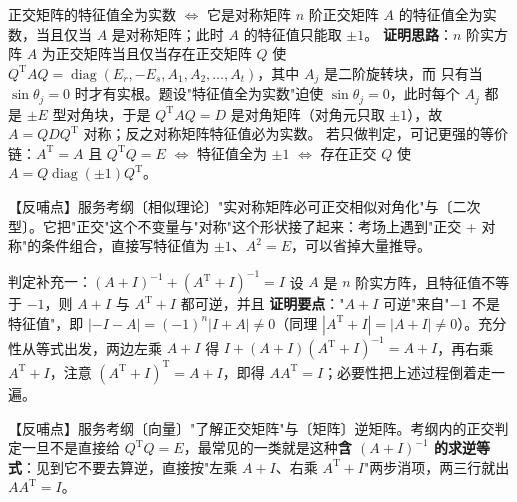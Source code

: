 \begin{fdeep}{正交矩阵的特征值全为实数 $\iff$ 它是对称矩阵}
$n$ 阶正交矩阵 $A$ 的特征值全为实数，当且仅当 $A$ 是对称矩阵；此时 $A$ 的特征值只能取 $\pm1$。
\textbf{证明思路}：$n$ 阶实方阵 $A$ 为正交矩阵当且仅当存在正交矩阵 $Q$ 使 $Q^{\mathrm T}AQ=\operatorname{diag}(E_{r},-E_{s},A_{1},A_{2},\dots,A_{t})$，其中 $A_{j}$ 是二阶旋转块，而
只有当 $\sin\theta_{j}=0$ 时才有实根。题设"特征值全为实数"迫使 $\sin\theta_{j}=0$，此时每个 $A_{j}$ 都是 $\pm E$ 型对角块，于是 $Q^{\mathrm T}AQ=D$ 是对角矩阵（对角元只取 $\pm1$），故 $A=QDQ^{\mathrm T}$ 对称；反之对称矩阵特征值必为实数。
若只做判定，可记更强的等价链：$A^{\mathrm T}=A$ 且 $Q^{\mathrm T}Q=E$ $\iff$ 特征值全为 $\pm1$ $\iff$ 存在正交 $Q$ 使 $A=Q\operatorname{diag}(\pm1)Q^{\mathrm T}$。

【反哺点】服务考纲〔相似理论〕"实对称矩阵必可正交相似对角化"与〔二次型〕。它把"正交"这个不变量与"对称"这个形状接了起来：考场上遇到"正交 + 对称"的条件组合，直接写特征值为 $\pm1$、$A^{2}=E$，可以省掉大量推导。
\end{fdeep}


\begin{fdeep}{判定补充一：$(A+I)^{-1}+(A^{\mathrm T}+I)^{-1}=I$}
设 $A$ 是 $n$ 阶实方阵，且特征值不等于 $-1$，则 $A+I$ 与 $A^{\mathrm T}+I$ 都可逆，并且
\textbf{证明要点}："$A+I$ 可逆"来自"$-1$ 不是特征值"，即 $|{-}I-A|=(-1)^{n}|I+A|\ne0$（同理 $|A^{\mathrm T}+I|=|A+I|\ne0$）。充分性从等式出发，两边左乘 $A+I$ 得 $I+(A+I)(A^{\mathrm T}+I)^{-1}=A+I$，再右乘 $A^{\mathrm T}+I$，注意 $(A^{\mathrm T}+I)^{\mathrm T}=A+I$，即得 $AA^{\mathrm T}=I$；必要性把上述过程倒着走一遍。

【反哺点】服务考纲〔向量〕"了解正交矩阵"与〔矩阵〕逆矩阵。考纲内的正交判定一旦不是直接给 $Q^{\mathrm T}Q=E$，最常见的一类就是这种\textbf{含 $(A+I)^{-1}$ 的求逆等式}：见到它不要去算逆，直接按"左乘 $A+I$、右乘 $A^{\mathrm T}+I$"两步消项，两三行就出 $AA^{\mathrm T}=I$。
\end{fdeep}


